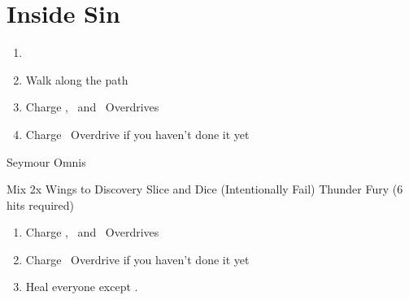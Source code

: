 \chapter{Inside Sin}
\begin{enumerate}
	\item \formation{\tidus}{\lulu}{\rikku}
	\item Walk along the path
	\item Charge \tidus , \lulu\ and \rikku\ Overdrives
	\item Charge \yuna\ Overdrive if you haven't done it yet
\end{enumerate}
\begin{battle}[80000]{Seymour Omnis}
	\begin{itemize}
		\rikkuf Mix 2x Wings to Discovery
		\tidusf Slice and Dice (Intentionally Fail)
		\luluf Thunder Fury (6 hits required)
	\end{itemize}
\end{battle}
\begin{enumerate}[resume]
	\item Charge \tidus , \lulu\ and \rikku\ Overdrives
	\item Charge \yuna\ Overdrive if you haven't done it yet
	\item Heal everyone except \rikku . 
\end{enumerate}
